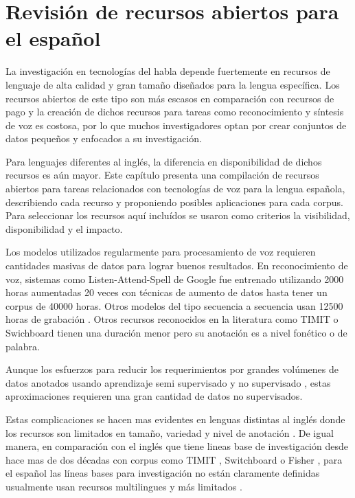 \chapter{Revisión de recursos abiertos para el español}

La investigación en tecnologías del habla depende fuertemente en recursos de lenguaje de alta calidad y gran tamaño diseñados para la lengua específica. Los recursos abiertos de este tipo son más escasos en comparación con recursos de pago y la creación de dichos recursos para tareas como reconocimiento y síntesis de voz es costosa, por lo que muchos investigadores optan por crear conjuntos de datos pequeños y enfocados a su investigación.

Para lenguajes diferentes al inglés, la diferencia en disponibilidad de dichos recursos es aún mayor. Este capítulo presenta una compilación de recursos abiertos para tareas relacionados con tecnologías de voz para la lengua española, describiendo cada recurso y proponiendo posibles aplicaciones para cada corpus. Para seleccionar los recursos aquí incluídos se usaron como criterios la visibilidad, disponibilidad y el impacto.


Los modelos utilizados regularmente para procesamiento de voz requieren cantidades masivas de datos para lograr buenos resultados. En reconocimiento de voz, sistemas como Listen-Attend-Spell de Google \cite{Chan2016} fue entrenado utilizando 2000 horas aumentadas 20 veces con técnicas de aumento de datos hasta tener un corpus de 40000 horas. Otros modelos del tipo secuencia a secuencia usan 12500 horas de grabación \cite{Chiu2018}. Otros recursos reconocidos en la literatura como  TIMIT \cite{TIMIT} o Swichboard \cite{Switchboard} tienen una duración menor pero su anotación es a nivel fonético o de palabra.

Aunque los esfuerzos para reducir los requerimientos por grandes volúmenes de datos anotados usando aprendizaje semi supervisado \cite{AmazonSemiSupervised} y no supervisado \cite{ZeroResources}, estas aproximaciones requieren una gran cantidad de datos no supervisados.

Estas complicaciones se hacen mas evidentes en lenguas distintas al inglés donde los recursos son limitados en tamaño, variedad y nivel de anotación \cite{HernndezMena2017}. De igual manera, en comparación con el inglés que  tiene lineas base de investigación desde hace mas de dos décadas con corpus como TIMIT \cite{TIMIT}, Switchboard \cite{Switchboard} o Fisher \cite{Fisher}, para el español las líneas bases para investigación no están claramente definidas usualmente usan recursos multilingues y más limitados \cite{euronews_multilingual,librilight}.

